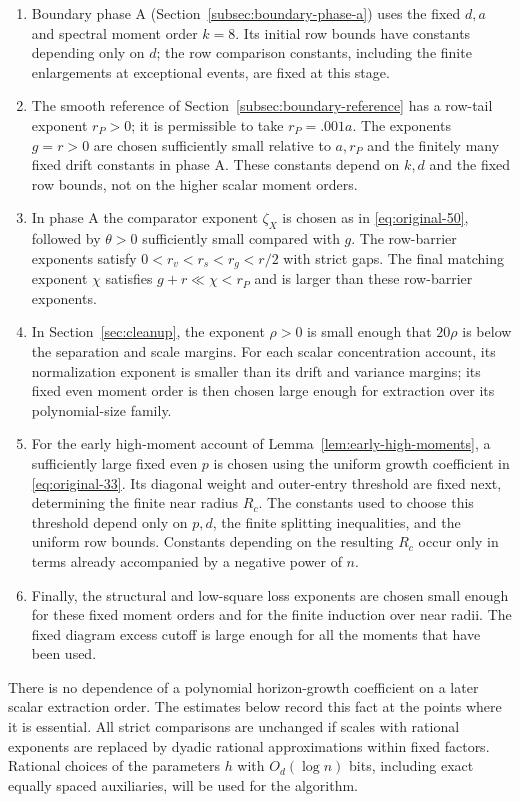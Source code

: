 \begin{enumerate}
\item Boundary phase A (Section~\ref{subsec:boundary-phase-a}) uses the
fixed $d,a$ and spectral moment order $k=8$. Its initial row bounds have
constants depending only on $d$; the row comparison constants, including
the finite enlargements at exceptional events, are fixed at this stage.
\item The smooth reference of Section~\ref{subsec:boundary-reference}
has a row-tail exponent $r_P>0$; it is permissible to take $r_P=.001a$.
The exponents $g=r>0$ are chosen sufficiently small relative to $a,r_P$
and the finitely many fixed drift constants in phase A. These constants
depend on $k,d$ and the fixed row bounds, not on the higher scalar moment
orders.
\item In phase A the comparator exponent $\zeta_X$ is chosen as in
\eqref{eq:original-50}, followed by $\theta>0$ sufficiently small
compared with $g$. The row-barrier exponents satisfy
$0<r_v<r_s<r_g<r/2$ with strict gaps. The final matching exponent $\chi$
satisfies $g+r\ll\chi<r_P$ and is larger than these row-barrier exponents.
\item In Section~\ref{sec:cleanup}, the exponent $\rho>0$ is small enough
that $20\rho$ is below the separation and scale margins. For each scalar
concentration account, its normalization exponent is smaller than its
drift and variance margins; its fixed even moment order is then chosen
large enough for extraction over its polynomial-size family.
\item For the early high-moment account of
Lemma~\ref{lem:early-high-moments}, a sufficiently large fixed even $p$
is chosen using the uniform growth coefficient in
\eqref{eq:original-33}. Its diagonal weight and outer-entry threshold
are fixed next, determining the finite near radius $R_c$.
The constants used to choose this threshold depend only on $p,d$, the
finite splitting inequalities, and the uniform row bounds.  Constants
depending on the resulting $R_c$ occur only in terms already accompanied
by a negative power of $n$.
\item Finally, the structural and low-square loss exponents are chosen
small enough for these fixed moment orders and for the finite induction
over near radii. The fixed diagram excess cutoff is large enough for all
the moments that have been used.
\end{enumerate}
There is no dependence of a polynomial horizon-growth coefficient on a
later scalar extraction order.  The estimates below record this fact at
the points where it is essential.  All strict comparisons are unchanged
if scales with rational exponents are replaced by dyadic rational
approximations within fixed factors.  Rational choices of the parameters
$h$ with $O_d(\log n)$ bits, including exact equally spaced auxiliaries,
will be used for the algorithm.
